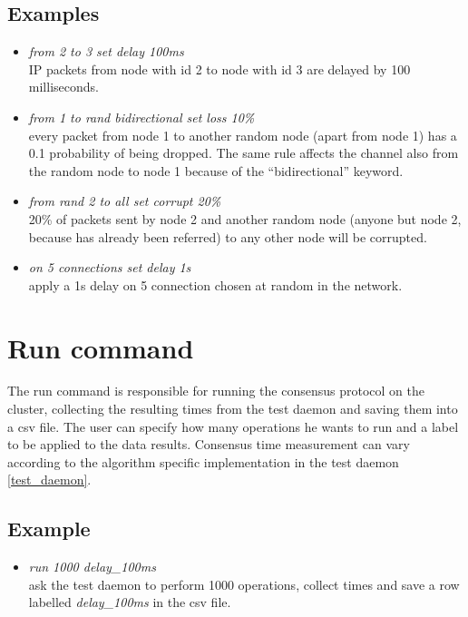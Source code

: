 \subsection{Examples}
\begin{itemize}
  \item \emph{from 2 to 3 set delay 100ms} \\
  IP packets from node with id 2 to node with id 3 are delayed by 100 milliseconds.
  \item \emph{from 1 to rand bidirectional set loss 10\%} \\
  every packet from node 1 to another random node (apart from node 1) has a 0.1 probability of being dropped. The same rule affects the channel also from the random node to node 1 because of the “bidirectional” keyword.
  \item \emph{from rand 2 to all set corrupt 20\%} \\
  20\% of packets sent by node 2 and another random node (anyone but node 2, because has already been referred) to any other node will be corrupted.
  \item \emph{on 5 connections set delay 1s} \\
  apply a 1s delay on 5 connection chosen at random in the network.
\end{itemize}

\section{Run command}
The run command is responsible for running the consensus protocol on the cluster, collecting the resulting times from the test daemon and saving them into a csv file. The user can specify how many operations he wants to run and a label to be applied to the data results. Consensus time measurement can vary according to the algorithm specific implementation in the test daemon \ref{test_daemon}.

\subsection{Example}
\begin{itemize}
  \item \emph{run 1000 delay\_100ms} \\
  ask the test daemon to perform 1000 operations, collect times and save a row labelled \emph{delay\_100ms} in the csv file.
\end{itemize}

